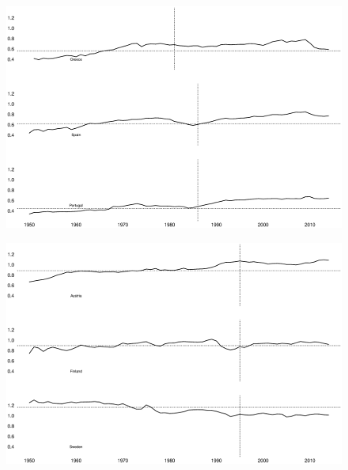 \documentclass{beamer}
\begin{document}
\begin{frame}
  \begin{figure}
    \includegraphics[scale=.3]{enlargement2.eps}
  \end{figure}
\end{frame}

\begin{frame}
  \begin{figure}
    \includegraphics[scale=.3]{enlargement3.eps}
  \end{figure}
\end{frame}
\end{document}
